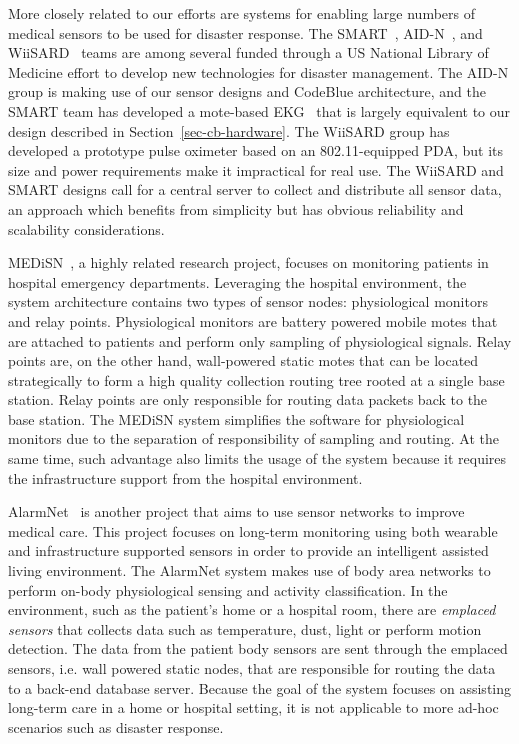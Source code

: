 More closely related to our efforts are systems for enabling large
numbers of medical sensors to be used for disaster response. The
SMART~\cite{smart}, AID-N~\cite{aid-n}, and WiiSARD~\cite{wiisard}
teams are among several funded through a US National Library of
Medicine effort to develop new technologies for disaster management.
The AID-N group is making use of our sensor designs and CodeBlue architecture, and the SMART
team has developed a mote-based EKG~\cite{eugene-shih-demo} that is
largely equivalent to our design described in
Section~\ref{sec-cb-hardware}.  The WiiSARD group has developed a
prototype pulse oximeter based on an 802.11-equipped PDA, but its size
and power requirements make it impractical for real use. The
WiiSARD and SMART designs call for a central server to collect and
distribute all sensor data, an approach which benefits from simplicity
but has obvious reliability and scalability considerations. 

MEDiSN~\cite{medisn-bodynets09}, a highly related research project, 
focuses on monitoring patients in hospital emergency departments. Leveraging
the hospital environment, the system architecture contains two types of sensor
nodes: physiological monitors and relay points. Physiological monitors are
battery powered mobile motes that are attached to patients and perform only
sampling of physiological signals.  Relay points are, on the other hand,
wall-powered static motes that can be located strategically to form a high
quality collection routing tree rooted at a single base station. Relay points
are only responsible for routing data packets back to the base station. The
MEDiSN system simplifies the software for physiological monitors due to the
separation of responsibility of sampling and routing. At the same time, such
advantage also limits the usage of the system because it requires the
infrastructure support from the hospital environment.

AlarmNet~\cite{alarmnet-network08} is another project that aims to use sensor
networks to improve medical care. This project focuses on long-term monitoring
using both wearable and infrastructure supported sensors in order to provide
an intelligent assisted living environment. The AlarmNet system makes use of
body area networks to perform on-body physiological sensing and activity
classification. In the environment, such as the patient's home or a hospital
room, there are {\em emplaced sensors} that collects data such as temperature,
dust, light or perform motion detection. The data from the patient body
sensors are sent through the emplaced sensors, i.e. wall powered static nodes,
that are responsible for routing the data to a back-end database server. Because
the goal of the system focuses on assisting long-term care in a home or
hospital setting, it is not applicable to more ad-hoc scenarios such as 
disaster response.


